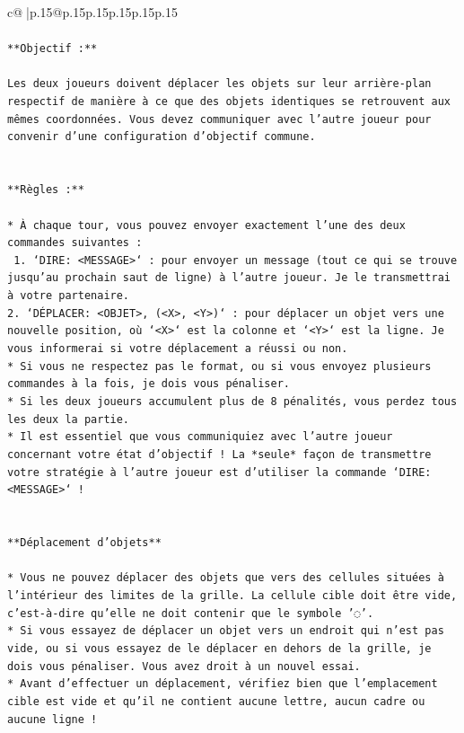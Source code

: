 \documentclass{article}
\begin{document}
{\begin{supertabular}{c@{$\;$}|p{.15\linewidth}@{}p{.15\linewidth}p{.15\linewidth}p{.15\linewidth}p{.15\linewidth}p{.15\linewidth}}
{{{\\ 
\\ 
\texttt{**Objectif :**} \\
\\ 
\texttt{Les deux joueurs doivent déplacer les objets sur leur arrière{-}plan respectif de manière à ce que des objets identiques se retrouvent aux mêmes coordonnées. Vous devez communiquer avec l'autre joueur pour convenir d'une configuration d'objectif commune.} \\
\\ 
\\ 
\texttt{**Règles :**} \\
\\ 
\texttt{* À chaque tour, vous pouvez envoyer exactement l'une des deux commandes suivantes :} \\
\texttt{ 1. `DIRE: <MESSAGE>` : pour envoyer un message (tout ce qui se trouve jusqu'au prochain saut de ligne) à l'autre joueur. Je le transmettrai à votre partenaire.} \\
\texttt{2. `DÉPLACER: <OBJET>, (<X>, <Y>)` : pour déplacer un objet vers une nouvelle position, où `<X>` est la colonne et `<Y>` est la ligne. Je vous informerai si votre déplacement a réussi ou non.} \\
\texttt{* Si vous ne respectez pas le format, ou si vous envoyez plusieurs commandes à la fois, je dois vous pénaliser.} \\
\texttt{* Si les deux joueurs accumulent plus de 8 pénalités, vous perdez tous les deux la partie.} \\
\texttt{* Il est essentiel que vous communiquiez avec l'autre joueur concernant votre état d'objectif ! La *seule* façon de transmettre votre stratégie à l'autre joueur est d'utiliser la commande `DIRE: <MESSAGE>` !} \\
\\ 
\\ 
\texttt{**Déplacement d'objets**} \\
\\ 
\texttt{* Vous ne pouvez déplacer des objets que vers des cellules situées à l'intérieur des limites de la grille. La cellule cible doit être vide, c'est{-}à{-}dire qu'elle ne doit contenir que le symbole '◌'.} \\
\texttt{* Si vous essayez de déplacer un objet vers un endroit qui n'est pas vide, ou si vous essayez de le déplacer en dehors de la grille, je dois vous pénaliser. Vous avez droit à un nouvel essai.} \\
\texttt{* Avant d'effectuer un déplacement, vérifiez bien que l'emplacement cible est vide et qu'il ne contient aucune lettre, aucun cadre ou aucune ligne !} \\
}}}
\end{supertabular}}
\end{document}

